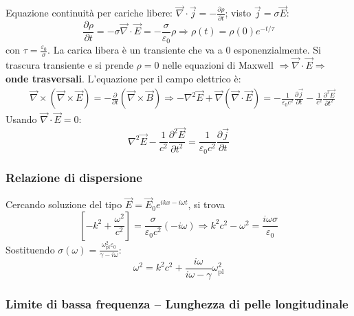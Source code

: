 \documentclass[a4paper]{scrartcl}
\numberwithin{equation}{subsection}
\theoremstyle{style1}
\begin{document}
Equazione continuit\`a per cariche libere: $\vec{\nabla }\cdot \vec{j}= -\frac{\partial \rho }{\partial t} $; visto $\vec{j}=\sigma \vec{E}$:
\begin{equation}
	\frac{\partial \rho }{\partial t} = - \sigma \vec{\nabla }\cdot \vec{E}= - \frac{\sigma}{\varepsilon _0} \rho \Rightarrow \rho (t) = \rho (0) e^{- t / \tau } 
\end{equation}
con $\tau  = \frac{\varepsilon _0}{\sigma }$. La carica libera \`e un transiente che va a $0$ esponenzialmente. Si trascura transiente e si prende $\rho =0$ nelle equazioni di Maxwell $\Rightarrow \vec{\nabla }\cdot \vec{E}\Rightarrow $ \textbf{onde trasversali}. L'equazione per il campo elettrico \`e:
\[
\begin{split}
	&\vec{\nabla }\times (\vec{\nabla }\times \vec{E}) = - \frac{\partial }{\partial t} (\vec{\nabla }\times \vec{B})\Rightarrow -\nabla ^2 \vec{E}+\vec{\nabla }(\vec{\nabla }\cdot \vec{E}) = -\frac{1}{\varepsilon _0c^2} \frac{\partial \vec{j}}{\partial t } -\frac{1}{c^2}\frac{\partial ^2 \vec{E}}{\partial t^2}  
\end{split}
\] 
Usando $\vec{\nabla }\cdot \vec{E}=0$:
\begin{equation}
	\nabla ^2 \vec{E} -\frac{1}{c^2}\frac{\partial ^2 \vec{E}}{\partial t^2} =\frac{1}{\varepsilon _0 c^2}\frac{\partial \vec{j}}{\partial t} 
\end{equation}
\subsubsection{Relazione di dispersione}

Cercando soluzione del tipo $\vec{E}=\vec{E}_0 e^{ikx - i \omega t} $, si trova
\begin{equation}
		\left[ -k^2 + \frac{\omega^2}{c^2} \right] = \frac{\sigma }{\varepsilon _0 c^2} (-i\omega)\Rightarrow k^2 c^2 - \omega^2 = \frac{i\omega \sigma }{\varepsilon_0}
\end{equation}
Sostituendo $\sigma (\omega) = \frac{\omega_\text{pl}^2 \varepsilon _0}{\gamma-i\omega}$:
\begin{equation}
	\omega^2 = k^2 c^2 + \frac{i\omega}{i\omega -\gamma } \omega_\text{pl}^2
\end{equation}
\subsubsection{Limite di bassa frequenza -- Lunghezza di pelle longitudinale}
\end{document}
